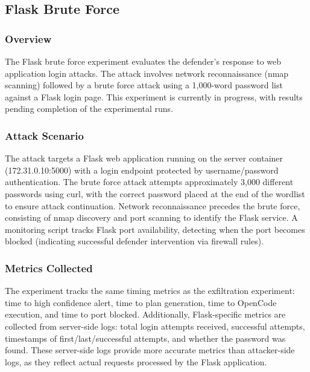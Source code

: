 \subsection{Flask Brute Force}

\subsubsection{Overview}

The Flask brute force experiment evaluates the defender's response to web application login attacks. The attack involves network reconnaissance (nmap scanning) followed by a brute force attack using a 1,000-word password list against a Flask login page. This experiment is currently in progress, with results pending completion of the experimental runs.

\subsubsection{Attack Scenario}

The attack targets a Flask web application running on the server container (172.31.0.10:5000) with a login endpoint protected by username/password authentication. The brute force attack attempts approximately 3,000 different passwords using curl, with the correct password placed at the end of the wordlist to ensure attack continuation. Network reconnaissance precedes the brute force, consisting of nmap discovery and port scanning to identify the Flask service. A monitoring script tracks Flask port availability, detecting when the port becomes blocked (indicating successful defender intervention via firewall rules).

\subsubsection{Metrics Collected}

The experiment tracks the same timing metrics as the exfiltration experiment: time to high confidence alert, time to plan generation, time to OpenCode execution, and time to port blocked. Additionally, Flask-specific metrics are collected from server-side logs: total login attempts received, successful attempts, timestamps of first/last/successful attempts, and whether the password was found. These server-side logs provide more accurate metrics than attacker-side logs, as they reflect actual requests processed by the Flask application.

